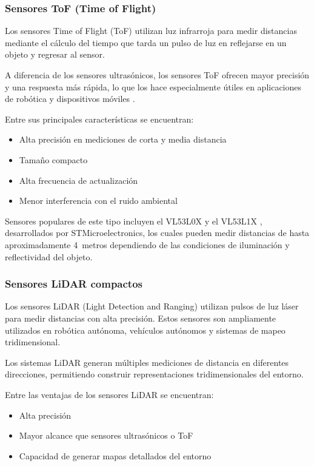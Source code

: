 \subsubsection{Sensores ToF (Time of Flight)}

Los sensores Time of Flight (ToF) utilizan luz infrarroja para medir distancias mediante el cálculo del tiempo que tarda un pulso de luz en reflejarse en un objeto y regresar al sensor.

A diferencia de los sensores ultrasónicos, los sensores ToF ofrecen mayor precisión y una respuesta más rápida, lo que los hace especialmente útiles en aplicaciones de robótica y dispositivos móviles \cite{vl53l1x_product}.

Entre sus principales características se encuentran:

\begin{itemize}
\item Alta precisión en mediciones de corta y media distancia
\item Tamaño compacto
\item Alta frecuencia de actualización
\item Menor interferencia con el ruido ambiental
\end{itemize}

Sensores populares de este tipo incluyen el VL53L0X \cite{vl53l0x_datasheet} y el VL53L1X \cite{vl53l1x_datasheet}, desarrollados por STMicroelectronics, los cuales pueden medir distancias de hasta aproximadamente 4~metros dependiendo de las condiciones de iluminación y reflectividad del objeto.

\subsubsection{Sensores LiDAR compactos}

Los sensores LiDAR (Light Detection and Ranging) utilizan pulsos de luz láser para medir distancias con alta precisión. Estos sensores son ampliamente utilizados en robótica autónoma, vehículos autónomos y sistemas de mapeo tridimensional.

Los sistemas LiDAR generan múltiples mediciones de distancia en diferentes direcciones, permitiendo construir representaciones tridimensionales del entorno.

Entre las ventajas de los sensores LiDAR se encuentran:

\begin{itemize}
\item Alta precisión
\item Mayor alcance que sensores ultrasónicos o ToF
\item Capacidad de generar mapas detallados del entorno
\end{itemize}

